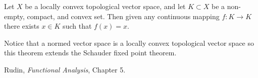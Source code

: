 \documentclass[12pt]{article}
\theoremstyle{remark}
\begin{document}
Let $X$ be a locally convex topological vector space, and let $K\subset X$ be a non-empty, compact, and convex set. 
Then given any continuous mapping $f\colon K \to K$
there exists $x\in K$ such that $f(x)=x$.

Notice that a normed vector space is a locally convex topological
vector space so this theorem extends the Schauder fixed point theorem.

\begin{thebibliography}{9}
 Rudin, \emph{Functional Analysis}, Chapter 5.
\end{thebibliography}
\end{document}
